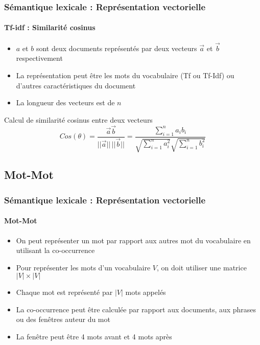 \documentclass[xcolor=table]{beamer}
\begin{document}
\begin{frame}
\frametitle{Sémantique lexicale : Représentation vectorielle}
\framesubtitle{Tf-idf : Similarité cosinus}

\begin{minipage}{.68\textwidth}
\begin{itemize}
	\item $a$ et $b$ sont deux documents représentés par deux vecteurs $\overrightarrow{a}$ et $\overrightarrow{b}$ respectivement
	\item La représentation peut être les mots du vocabulaire (Tf ou Tf-Idf) ou d'autres caractéristiques du document
	\item La longueur des vecteurs est de $n$
\end{itemize}
\end{minipage}
\begin{minipage}{.3\textwidth}
\end{minipage}

\begin{block}{Calcul de similarité cosinus entre deux vecteurs}
	\[
	Cos(\theta) = \frac{\overrightarrow{a} \overrightarrow{b}}{||\overrightarrow{a}||\, ||\overrightarrow{b}||}
	= \frac{\sum_{i=1}^{n} a_i b_i}{\sqrt{\sum_{i=1}^{n} a_i^2} \sqrt{\sum_{i=1}^{n} b_i^2}}
	\]
\end{block}

\end{frame}

\subsection{Mot-Mot}

\begin{frame}
\frametitle{Sémantique lexicale : Représentation vectorielle}
\framesubtitle{Mot-Mot}

\begin{itemize}
	\item On peut représenter un mot par rapport aux autres mot du vocabulaire en utilisant la co-occurrence
	\item Pour représenter les mots d'un vocabulaire $ V $, on doit utiliser une matrice $|V| \times |V|$
	\item Chaque mot est représenté par $|V|$ mots appelés 
	\item La co-occurrence peut être calculée par rapport aux documents, aux phrases ou des fenêtres auteur du mot
	\item La fenêtre peut être 4 mots avant et 4 mots après
\end{itemize}

\end{frame}
\end{document}
